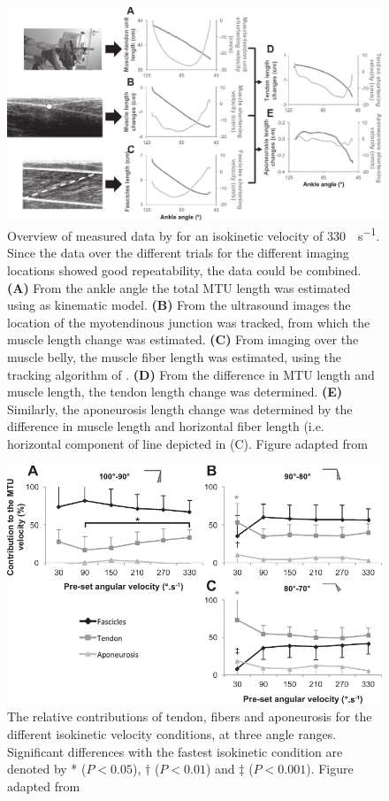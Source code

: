 	\begin{figure}[!t]
		\centering
		\includegraphics[width=\linewidth]{Figures/mtu_imaging/hauraix_2013_mtu_velocity.pdf}
		\caption{Overview of measured data by \citeauthor{hauraix_shortening_2013} for an isokinetic velocity of \SI{330}{\deg\per\second}. Since the data over the different trials for the different imaging locations showed good repeatability, the data could be combined. \textbf{(A)} From the ankle angle the total MTU length was estimated using as kinematic model. \textbf{(B)} From the ultrasound images the location of the myotendinous junction was tracked, from which the muscle length change was estimated. \textbf{(C)} From imaging over the muscle belly, the muscle fiber length was estimated, using the tracking algorithm of \citet{cronin_automatic_2011}. \textbf{(D)} From the difference in MTU length and muscle length, the tendon length change was determined. \textbf{(E)} Similarly, the aponeurosis length change was determined by the difference in muscle length and horizontal fiber length (i.e. horizontal component of line depicted in (C). Figure adapted from \citet{hauraix_shortening_2013}}
		\label{fig:hauraix_2013}
	\end{figure}
	
	\begin{figure}[t]
		\centering
		\includegraphics[width=.8\linewidth]{Figures/mtu_imaging/hauraix_2013_mtu_contrib.pdf}
		\caption{The relative contributions of tendon, fibers and aponeurosis for the different isokinetic velocity conditions, at three angle ranges. Significant differences with the fastest isokinetic condition are denoted by * ($P<0.05$), $\dag$ ($P<0.01$) and $\ddag$ ($P<0.001$). Figure adapted from \citet{hauraix_shortening_2013}}
		\label{fig:hauraix_2013_contrib}
	\end{figure}

